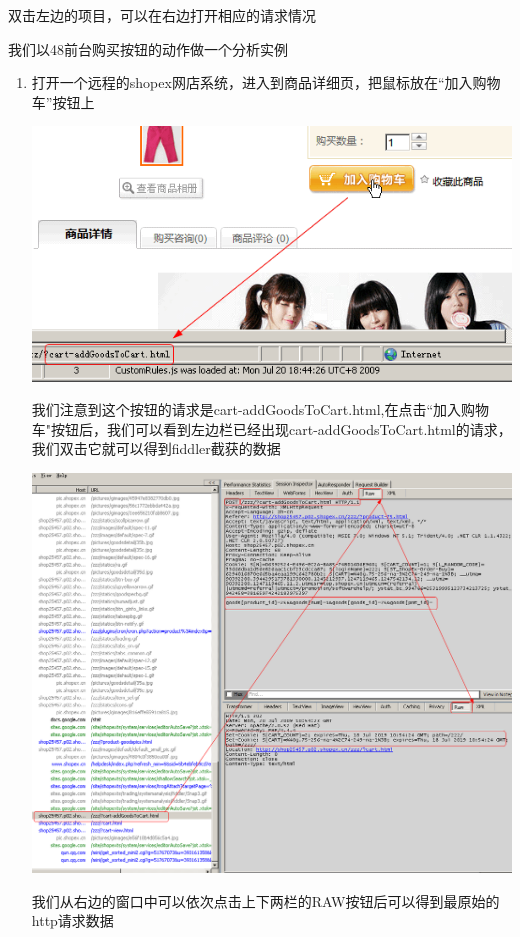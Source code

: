 \documentclass{article}
\begin{document}
双击左边的项目，可以在右边打开相应的请求情况

我们以48前台购买按钮的动作做一个分析实例

\begin{enumerate}
\item 打开一个远程的shopex网店系统，进入到商品详细页，把鼠标放在“加入购物车”按钮上

\includegraphics{img/operation/debug/fildder/3.png}

我们注意到这个按钮的请求是cart-addGoodsToCart.html,在点击“加入购物车"按钮后，我们可以看到左边栏已经出现cart-addGoodsToCart.html的请求，我们双击它就可以得到fiddler截获的数据

\includegraphics{img/operation/debug/fildder/4.png}

我们从右边的窗口中可以依次点击上下两栏的RAW按钮后可以得到最原始的http请求数据
\end{enumerate}
\end{document}
